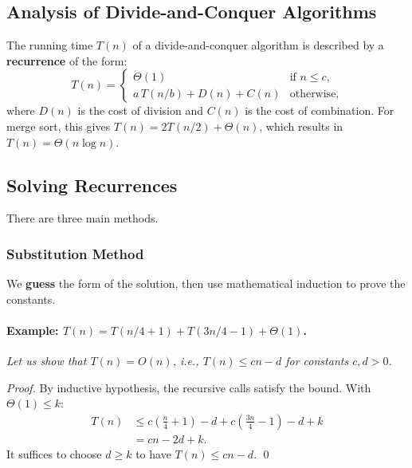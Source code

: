\subsection{Analysis of Divide-and-Conquer Algorithms}

The running time $T(n)$ of a divide-and-conquer algorithm is described by a
\textbf{recurrence} of the form:
\[
  T(n) =
  \begin{cases}
    \Theta(1)               & \text{if } n \le c, \\
    a\,T(n/b) + D(n) + C(n) & \text{otherwise,}
  \end{cases}
\]
where $D(n)$ is the cost of division and $C(n)$ is the cost of combination. For merge
sort, this gives $T(n) = 2T(n/2) + \Theta(n)$, which results in $T(n) = \Theta(n\log n)$.

\subsection{Solving Recurrences}

There are three main methods.

\subsubsection{Substitution Method}

We \textbf{guess} the form of the solution, then use mathematical induction
to prove the constants.

\paragraph{Example: $T(n) = T(n/4 + 1) + T(3n/4 - 1) + \Theta(1)$.}
\emph{Let us show that $T(n) = O(n)$, i.e., $T(n) \le cn - d$ for constants $c, d > 0$.}

\begin{proof}
By inductive hypothesis, the recursive calls satisfy the bound. With $\Theta(1) \le k$:
\begin{align*}
  T(n) &\le c\!\left(\tfrac{n}{4}+1\right) - d
          + c\!\left(\tfrac{3n}{4}-1\right) - d + k \\
       &= cn - 2d + k.
\end{align*}
It suffices to choose $d \ge k$ to have $T(n) \le cn - d$. \qed
\end{proof}

